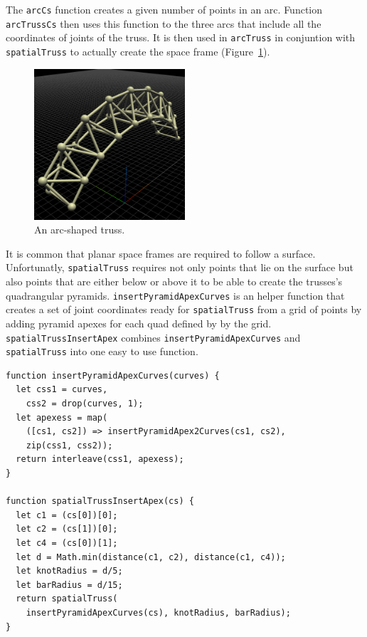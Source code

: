 The {\tt arcCs} function creates a given number of points in an arc.
Function {\tt arcTrussCs} then uses this function to the three arcs that include all the coordinates of joints of the truss.
It is then used in {\tt arcTruss} in conjuntion with {\tt spatialTruss} to actually create the space frame (Figure~\ref{fig:arc:truss}).

\begin{figure}
  \centering
  \includegraphics[width=0.5\textwidth]{./images/detail_examples/arc_truss_crop}
  \caption{An arc-shaped truss.}
  \label{fig:arc:truss}
\end{figure}

It is common that planar space frames are required to follow a surface.
Unfortunatly, {\tt spatialTruss} requires not only points that lie on the surface but also points that are either below or above it to be able to create the trusses's quadrangular pyramids.
{\tt insertPyramidApexCurves} is an helper function that creates a set of joint coordinates ready for {\tt spatialTruss} from a grid of points by adding pyramid apexes for each quad defined by by the grid.
{\tt spatialTrussInsertApex} combines {\tt insertPyramidApexCurves} and {\tt spatialTruss} into one easy to use function.

\begin{verbatim}
function insertPyramidApexCurves(curves) {
  let css1 = curves,
    css2 = drop(curves, 1);
  let apexess = map(
    ([cs1, cs2]) => insertPyramidApex2Curves(cs1, cs2),
    zip(css1, css2));
  return interleave(css1, apexess);
}

function spatialTrussInsertApex(cs) {
  let c1 = (cs[0])[0];
  let c2 = (cs[1])[0];
  let c4 = (cs[0])[1];
  let d = Math.min(distance(c1, c2), distance(c1, c4));
  let knotRadius = d/5;
  let barRadius = d/15;
  return spatialTruss(
    insertPyramidApexCurves(cs), knotRadius, barRadius);
}
\end{verbatim}

